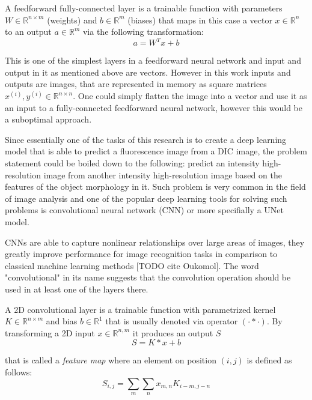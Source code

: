 \begin{definition}
	A feedforward fully-connected layer is a trainable function with parameters $W \in \mathbb{R}^{n \times m}$ (weights) and $b \in \mathbb{R}^{m}$ (biases) that maps in this case a vector $x \in \mathbb{R}^{n}$ to an output $a \in \mathbb{R}^{m}$ via the following transformation:
		\begin{equation}
			a = W^{T}x + b
		\end{equation}
\end{definition}

This is one of the simplest layers in a feedforward neural network and input and output in it as mentioned above are vectors. However in this work inputs and outputs are images, that are represented in memory as square matrices $x^{(i)}, y^{(i)} \in \mathbb{R}^{n \times n}$. One could simply flatten the image into a vector and use it as an input to a fully-connected feedforward neural network, however this would be a suboptimal approach. 

Since essentially one of the tasks of this research is to create a deep learning model that is able to predict a fluorescence image from a DIC image, the problem statement could be boiled down to the following: predict an intensity high-resolution image from another intensity high-resolution image based on the features of the object morphology in it. Such problem is very common in the field of image analysis and one of the popular deep learning tools for solving such problems is convolutional neural network (CNN) or more specifially a UNet model.

CNNs are able to capture nonlinear relationships over large areas of images, they greatly improve performance for image recognition tasks in comparison to classical machine learning methods [TODO cite Oukomol]. The word "convolutional" in its name suggests that the convolution operation should be used in at least one of the layers there.  

\begin{definition}
	A 2D convolutional layer is a trainable function with parametrized kernel $K \in \mathbb{R}^{n \times m}$ and bias $b \in \mathbb{R}^{1}$ that is usually denoted via operator $(\cdot * \cdot)$. By transforming a 2D input $x \in \mathbb{R}^{n, m}$ it produces an output $S$
	\begin{equation}
		S = K * x + b
	\end{equation}

	that is called a \textit{feature map} where an element on position $(i, j)$ is defined as follows:
		\begin{equation}
			S_{i, j} = \sum_{m} \sum_{n} x_{m, n}  K_{i - m, j - n}
		\end{equation}
\end{definition}

